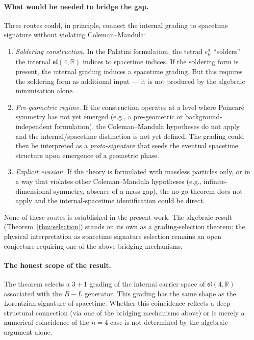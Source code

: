 \documentclass[11pt]{article}
\theoremstyle{plain}
\theoremstyle{definition}
\theoremstyle{remark}
\newcommand{\sln}[1]{\mathfrak{sl}(#1,\mathbb{R})}
\begin{document}
\paragraph{What would be needed to bridge the gap.}
Three routes could, in principle, connect the internal grading to
spacetime signature without violating Coleman--Mandula:
\begin{enumerate}\itemsep0pt
  \item \emph{Soldering construction.}  In the Palatini formulation,
    the tetrad $e^a_\mu$ ``solders'' the internal $\sln{4}$ indices
    to spacetime indices.  If the soldering form is present, the
    internal grading induces a spacetime grading.  But this requires
    the soldering form as additional input --- it is not produced by
    the algebraic minimisation alone.
  \item \emph{Pre-geometric regime.}  If the construction operates
    at a level where Poincar\'{e} symmetry has not yet emerged (e.g.,
    a pre-geometric or background-independent formulation), the
    Coleman--Mandula hypotheses do not apply and the internal/spacetime
    distinction is not yet defined.  The grading could then be
    interpreted as a \emph{proto-signature} that seeds the eventual
    spacetime structure upon emergence of a geometric phase.
  \item \emph{Explicit evasion.}  If the theory is formulated with
    massless particles only, or in a way that violates other
    Coleman--Mandula hypotheses (e.g., infinite-dimensional symmetry,
    absence of a mass gap), the no-go theorem does not apply and
    the internal-spacetime identification could be direct.
\end{enumerate}
None of these routes is established in the present work.  The
algebraic result (Theorem~\ref{thm:selection}) stands on its own as
a grading-selection theorem; the physical interpretation as spacetime
signature selection remains an open conjecture requiring one of the
above bridging mechanisms.

\paragraph{The honest scope of the result.}
The theorem selects a $3{+}1$ grading of the internal carrier space
of $\sln{4}$ associated with the $B{-}L$ generator.  This grading
has the same shape as the Lorentzian signature of spacetime.  Whether
this coincidence reflects a deep structural connection (via one of
the bridging mechanisms above) or is merely a numerical coincidence
of the $n = 4$ case is not determined by the algebraic argument
alone.
\end{document}
